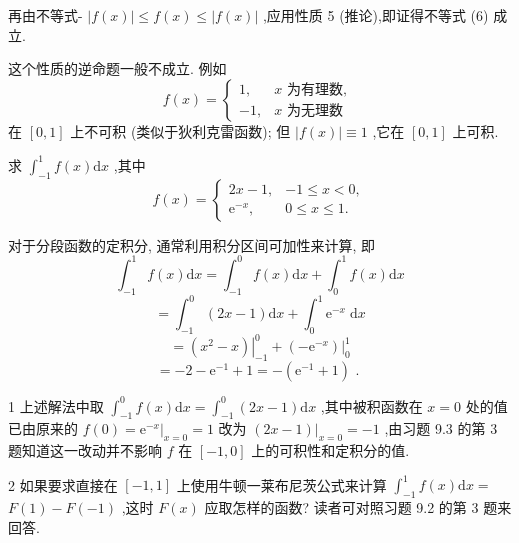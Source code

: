 再由不等式- \(\left| {f\left( x\right) }\right|  \leq  f\left( x\right)  \leq  \left| {f\left( x\right) }\right|\) ,应用性质 5 (推论),即证得不等式 (6) 成立.

\begin{remark}

\end{remark}
这个性质的逆命题一般不成立. 例如
\[
f\left( x\right)  = \begin{cases} 1, & x\text{ 为有理数, } \\   - 1, & x\text{ 为无理数 } \end{cases}
\]
在 \(\left\lbrack  {0,1}\right\rbrack\) 上不可积 (类似于狄利克雷函数); 但 \(\left| {f\left( x\right) }\right|  \equiv  1\) ,它在 \(\left\lbrack  {0,1}\right\rbrack\) 上可积.

\begin{example}

\end{example}
求 \({\int }_{-1}^{1}f\left( x\right) \mathrm{d}x\) ,其中
\[
f\left( x\right)  = \left\{  \begin{array}{ll} {2x} - 1, &  - 1 \leq  x < 0, \\  {\mathrm{e}}^{-x}, & 0 \leq  x \leq  1. \end{array}\right.
\]
\begin{solution}

\end{solution}
对于分段函数的定积分, 通常利用积分区间可加性来计算, 即
\[
{\int }_{-1}^{1}f\left( x\right) \mathrm{d}x = {\int }_{-1}^{0}f\left( x\right) \mathrm{d}x + {\int }_{0}^{1}f\left( x\right) \mathrm{d}x
\]
\[
= {\int }_{-1}^{0}\left( {{2x} - 1}\right) \mathrm{d}x + {\int }_{0}^{1}{\mathrm{e}}^{-x}\mathrm{\;d}x
\]
\[
= {\left. \left( {x}^{2} - x\right) \right| }_{-1}^{0} + {\left. \left( -{\mathrm{e}}^{-x}\right) \right| }_{0}^{1}
\]
\[
=  - 2 - {\mathrm{e}}^{-1} + 1 =  - \left( {{\mathrm{e}}^{-1} + 1}\right) \text{ . }
\]
\begin{remark}

\end{remark}
1 上述解法中取 \({\int }_{-1}^{0}f\left( x\right) \mathrm{d}x = {\int }_{-1}^{0}\left( {{2x} - 1}\right) \mathrm{d}x\) ,其中被积函数在 \(x = 0\) 处的值已由原来的 \(f\left( 0\right)  = {\left. {\mathrm{e}}^{-x}\right| }_{x = 0} = 1\) 改为 \({\left. \left( 2x - 1\right) \right| }_{x = 0} =  - 1\) ,由习题 9.3 的第 3 题知道这一改动并不影响 \(f\) 在 \(\left\lbrack  {-1,0}\right\rbrack\) 上的可积性和定积分的值.

\begin{remark}

\end{remark}
2 如果要求直接在 \(\left\lbrack  {-1,1}\right\rbrack\) 上使用牛顿一莱布尼茨公式来计算 \({\int }_{-1}^{1}f\left( x\right) \mathrm{d}x =\)  \(F\left( 1\right)  - F\left( {-1}\right)\) ,这时 \(F\left( x\right)\) 应取怎样的函数? 读者可对照习题 9.2 的第 3 题来回答.

